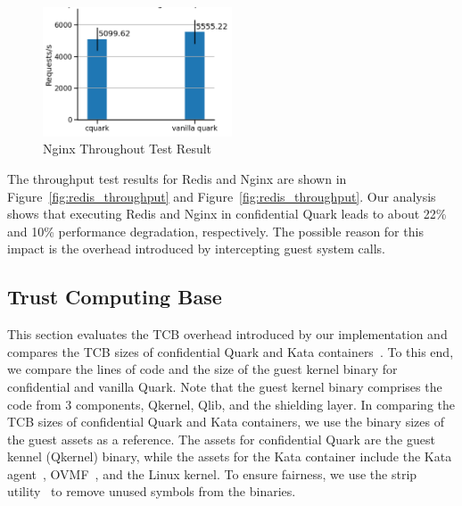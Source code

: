 \begin{figure}[!htb]
  \centering
  \includegraphics[width=0.5\textwidth]{images/nginx_throughput.PNG}
  \caption[Nginx Throughout Test]{Nginx Throughout Test Result}
  \label{fig:nginx_throughput}
\end{figure}

The throughput test results for Redis and Nginx are shown in Figure~\ref{fig:redis_throughput} and Figure~\ref{fig:redis_throughput}. Our analysis shows that executing Redis and Nginx in confidential Quark leads to about 22\% and 10\% performance degradation, respectively. 
The possible reason for this impact is the overhead introduced by intercepting guest system calls.


\subsection{Trust Computing Base}\label{tcb}

This section evaluates the \acrshort{TCB} overhead introduced by our implementation and compares the \acrshort{TCB}  sizes of confidential Quark and Kata containers~\cite*{Kata-Containers}. To this end, we compare the lines of code and the size of the guest kernel binary for confidential and 
vanilla Quark. Note that the guest kernel binary comprises the code from 3 components, Qkernel, Qlib, and the shielding layer. In comparing the  \acrshort{TCB} sizes of confidential Quark and Kata containers, we use the binary sizes of the guest assets as a reference. The assets for confidential Quark are the guest kennel (Qkernel) binary, while the 
assets for the Kata container include the Kata agent~\cite*{kata_agent}, OVMF~\cite*{ovmf}, and the Linux kernel. To ensure fairness, we use the strip utility~\cite*{strip} to remove unused symbols from the binaries.

